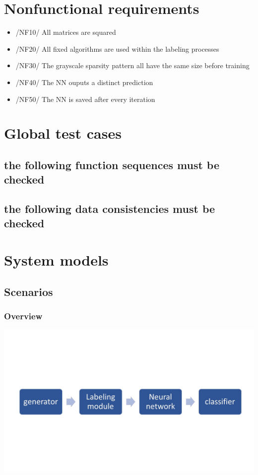 \documentclass[parskip=full]{scrartcl}
\begin{document}
\section{Nonfunctional requirements}
	\begin{itemize}
		\item /NF10/ All matrices are squared
		\item /NF20/ All fixed algorithms are used within the labeling processes
		\item /NF30/ The grayscale sparsity pattern all have the same size before training
		\item /NF40/ The NN ouputs a distinct prediction
		\item /NF50/ The NN is saved after every iteration
	\end{itemize}
	

\section{Global test cases}
\subsection{the following function sequences must be checked}
\subsection{the following data consistencies must be checked}
\newpage
\section{System models}
\subsection{Scenarios}
\subsubsection{Overview}
\begin{center}
\includegraphics[width=\textwidth]{workflow}
\end{center}
\end{document}
